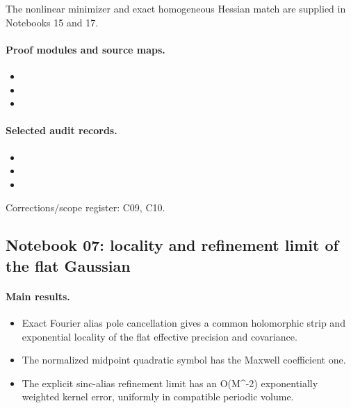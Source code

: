 \documentclass[11pt]{article}
\theoremstyle{remark}
\begin{document}
The nonlinear minimizer and exact homogeneous Hessian match are supplied in Notebooks 15 and 17.

\paragraph{Proof modules and source maps.}
\begingroup\small
\begin{itemize}
\item {}
\item {}
\item {}
\end{itemize}
\endgroup

\paragraph{Selected audit records.}
\begingroup\small
\begin{itemize}
\item {}
\item {}
\item {}
\end{itemize}
\endgroup
Corrections/scope register: C09, C10.\par

\subsection{Notebook 07: locality and refinement limit of the flat Gaussian}
\label{hnc-07}
\noindent{}\par

\paragraph{Main results.}
\begin{itemize}
\item Exact Fourier alias pole cancellation gives a common holomorphic strip and exponential locality of the flat effective precision and covariance.
\item The normalized midpoint quadratic symbol has the Maxwell coefficient one.
\item The explicit sinc-alias refinement limit has an O(M\textasciicircum{}-2) exponentially weighted kernel error, uniformly in compatible periodic volume.
\end{itemize}
\end{document}
